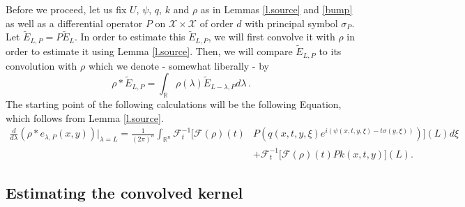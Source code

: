 \documentclass[10pt,twoside]{article}
\newcommand{\fou}{\mathcal{F}}
\newcommand{\R}{\mathbb{R}}
\newcommand{\man}{\mathcal{X}}
\numberwithin{theorem}{section}
\begin{document}
Before we proceed, let us fix $U$, $\psi$, $q$, $k$ and $\rho$ as in Lemmas \ref{l.source} and \ref{bump} as well as a differential operator $P$ on $\man\times \man$ of order $d$ with principal symbol $\sigma_P$. Let $\tilde{E}_{L,P}=P\tilde{E}_L$. In order to estimate this $\tilde{E}_{L,P}$, we will first convolve it with $\rho$ in order to estimate it using Lemma \ref{l.source}. Then, we will compare $\tilde{E}_{L,P}$ to its convolution with $\rho$ which we denote - somewhat liberally - by
\[
\rho*\tilde{E}_{L,P}=\int_{\R}\rho(\lambda)\tilde{E}_{L-\lambda,P}d\lambda\, .
\]
The starting point of the following calculations will be the following Equation, which follows from Lemma \ref{l.source}.
\begin{align}\label{e.ap}
\frac{d}{d\lambda}(\rho*e_{\lambda,P}(x,y))|_{\lambda=L}=\frac{1}{(2\pi)^n}\int_{\R^n}\fou^{-1}_t\Big[\fou(\rho)(t)&P \left(q(x,t,y,\xi)e^{i(\psi(x,t,y,\xi)-t\sigma(y,\xi))}\right) \Big](L)d\xi\\\nonumber
&+\fou^{-1}_t\big[\fou(\rho)(t)Pk(x,t,y)\big](L). 
\end{align}

\subsection{Estimating the convolved kernel}
\end{document}
